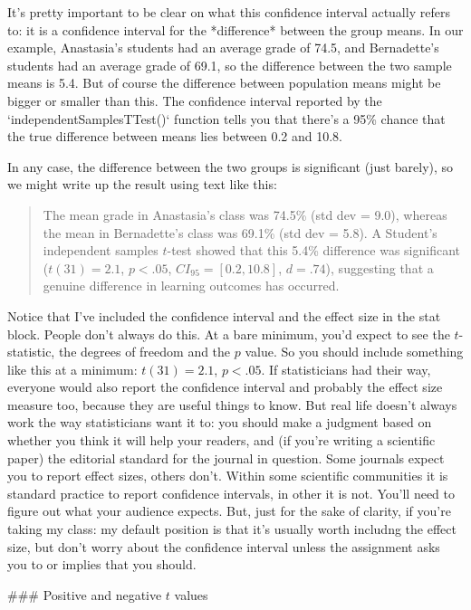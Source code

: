 It's pretty important to be clear on what this confidence interval actually refers to: it is a confidence interval for the *difference* between the group means. In our example, Anastasia's students had an average grade of 74.5, and Bernadette's students had an average grade of 69.1, so the difference between the two sample means is 5.4. But of course the difference between population means might be bigger or smaller than this. The confidence interval reported by the `independentSamplesTTest()` function tells you that there's a 95\% chance that the true difference between means lies between 0.2 and 10.8.  

In any case, the difference between the two groups is significant (just barely), so we might write up the result using text like this:
\begin{quote}
The mean grade in Anastasia's class was 74.5\% (std dev = 9.0), whereas the mean in Bernadette's class was 69.1\% (std dev = 5.8). A Student's independent samples $t$-test showed that this 5.4\% difference was significant ($t(31) = 2.1$, $p<.05$, $CI_{95} = [0.2, 10.8]$, $d = .74$), suggesting that a genuine difference in learning outcomes has occurred.  
\end{quote}
Notice that I've included the confidence interval and the effect size in the stat block. People don't always do this. At a bare minimum, you'd expect to see the $t$-statistic, the degrees of freedom and the $p$ value. So you should include something like this at a minimum: $t(31) = 2.1$, $p<.05$. If statisticians had their way, everyone would also report the confidence interval and probably the effect size measure too, because they are useful things to know. But real life doesn't always work the way statisticians want it to: you should make a judgment based on whether you think it will help your readers, and (if you're writing a scientific paper) the editorial standard for the journal in question. Some journals expect you to report effect sizes, others don't. Within some scientific communities it is standard practice to report confidence intervals, in other it is not. You'll need to figure out what your audience expects. But, just for the sake of clarity, if you're taking my class: my default position is that it's usually worth includng the effect size, but don't worry about the confidence interval unless the assignment asks you to or implies that you should.

 
### Positive and negative $t$ values

